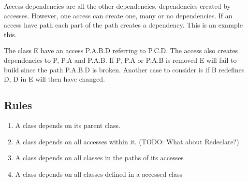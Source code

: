 \documentclass{cslthse-msc}
\begin{document}
Access dependencies are all the other dependencies, dependencies created by accesses. However, one access can create one, many or no dependencies. If an access have path each part of the path creates a dependency. This is an example this.

The class E have an access P.A.B.D referring to P.C.D. The access also creates dependencies to P, P.A and P.A.B. If P, P.A or P.A.B is removed E will fail to build since the path P.A.B.D is broken. Another case to consider is if B redefines D, D in E will then have changed.


\subsection{Rules}
\begin{enumerate}
\item A class depends on its parent class. 
\item A class depends on all accesses within it. (TODO: What about Redeclare?)
\item A class depends on all classes in the paths of its accesses
\item A class depends on all classes defined in a accessed class
\end{enumerate}
\end{document}
